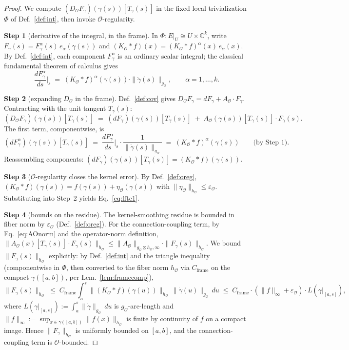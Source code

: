 \documentclass[11pt]{article}
\newcommand{\Obs}{\mathcal{O}}
\newcommand{\Eps}{\varepsilon_{\Obs}}
\newcommand{\AO}{A_{\Obs}}
\newcommand{\gO}{g_{\Obs}}
\newcommand{\hO}{h_{\Obs}}
\newcommand{\KO}{K_{\Obs}}
\newcommand{\DO}{D_{\Obs}}
\newcommand{\EE}{E}
\newcommand{\Cframe}{C_{\mathrm{frame}}}
\begin{document}
\begin{proof}
We compute $(\DO F_\gamma)(\gamma(s))[T_\gamma(s)]$ in the fixed
local trivialization $\Phi$ of Def.~\ref{def:int}, then invoke
$\Obs$-regularity.

\smallskip
\noindent\textbf{Step 1} (derivative of the integral, in the frame).
In $\Phi: \EE|_U \cong U \times \mathbb{C}^k$, write
$F_\gamma(s) = F_\gamma^\alpha(s)\, e_\alpha(\gamma(s))$ and
$(\KO * f)(x) = (\KO * f)^\alpha(x)\, e_\alpha(x)$. By
Def.~\ref{def:int}, each component $F_\gamma^\alpha$ is an ordinary
scalar integral; the classical fundamental theorem of calculus gives
\[
\frac{dF_\gamma^\alpha}{ds}\bigg|_s
\;=\; (\KO * f)^\alpha(\gamma(s)) \cdot \|\dot\gamma(s)\|_{\gO},
\qquad \alpha = 1, \ldots, k.
\]

\smallskip
\noindent\textbf{Step 2} (expanding $\DO$ in the frame).
Def.~\ref{def:cov} gives $\DO F_\gamma = dF_\gamma + \AO \cdot F_\gamma$.
Contracting with the unit tangent $T_\gamma(s)$:
\[
(\DO F_\gamma)(\gamma(s))[T_\gamma(s)]
\;=\; (dF_\gamma)(\gamma(s))[T_\gamma(s)] \;+\; \AO(\gamma(s))[T_\gamma(s)] \cdot F_\gamma(s).
\]
The first term, componentwise, is
\[
(dF_\gamma^\alpha)(\gamma(s))[T_\gamma(s)]
\;=\; \frac{dF_\gamma^\alpha}{ds}\bigg|_s \cdot \frac{1}{\|\dot\gamma(s)\|_{\gO}}
\;=\; (\KO * f)^\alpha(\gamma(s))
\qquad \text{(by Step~1)}.
\]
Reassembling components:
$(dF_\gamma)(\gamma(s))[T_\gamma(s)] = (\KO * f)(\gamma(s))$.

\smallskip
\noindent\textbf{Step 3} ($\Obs$-regularity closes the kernel error).
By Def.~\ref{def:oreg},
$(\KO * f)(\gamma(s)) = f(\gamma(s)) + \eta_\Obs(\gamma(s))$ with
$\|\eta_\Obs\|_{\hO} \leq \Eps$. Substituting into Step~2 yields
Eq.~\eqref{eq:fftc1}.

\smallskip
\noindent\textbf{Step 4} (bounds on the residue).
The kernel-smoothing residue is bounded in fiber norm by $\Eps$
(Def.~\ref{def:oreg}). For the connection-coupling term, by
Eq.~\eqref{eq:AOnorm} and the operator-norm definition,
$\|\AO(x)[T_\gamma(s)] \cdot F_\gamma(s)\|_{\hO}
\leq \|\AO\|_{\gO \otimes \hO, \infty} \cdot \|F_\gamma(s)\|_{\hO}$.
We bound $\|F_\gamma(s)\|_{\hO}$ explicitly: by Def.~\ref{def:int}
and the triangle inequality (componentwise in $\Phi$, then converted
to the fiber norm $\hO$ via $\Cframe$ on the compact
$\gamma([a, b])$, per Lem.~\ref{lem:framecomp}),
\[
\|F_\gamma(s)\|_{\hO}
\;\leq\; \Cframe \int_a^s \|(\KO * f)(\gamma(u))\|_{\hO}\, \|\dot\gamma(u)\|_{\gO}\, du
\;\leq\; \Cframe \cdot (\|f\|_\infty + \Eps) \cdot L(\gamma|_{[a, s]}),
\]
where $L(\gamma|_{[a, s]}) := \int_a^s \|\dot\gamma\|_{\gO}\, du$ is
$\gO$-arc-length and
$\|f\|_\infty := \sup_{x \in \gamma([a, b])} \|f(x)\|_{\hO}$
is finite by continuity of $f$ on a compact image. Hence
$\|F_\gamma\|_{\hO}$ is uniformly bounded on $[a, b]$, and the
connection-coupling term is $\Obs$-bounded.


\end{proof}
\end{document}
